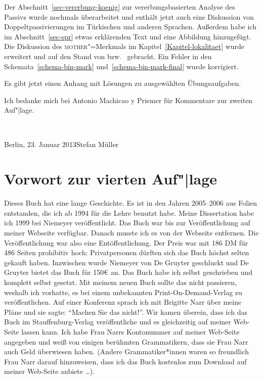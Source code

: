 Der Abschnitt~\ref{sec-vererbung-koenig} zur vererbungsbasierten Analyse des Passivs wurde nochmals
überarbeitet und enthält jetzt auch eine Diskussion von Doppeltpassivierungen im Türkischen und
anderen Sprachen. Außerdem habe ich im Abschnitt~\ref{sec-spr} etwas erklärenden Text und eine
Abbildung hinzugefügt. Die Diskussion des \textsc{mother}"=Merkmals im Kapitel~\ref{Kapitel-lokalitaet} wurde erweitert und auf
den Stand von  bzw.\  gebracht. 
Ein Fehler in den Schemata~\ref{schema-bin-mark} und~\ref{schema-bin-mark-final} wurde korrigiert.

Es gibt jetzt einen Anhang mit Lösungen zu ausgewählten Übungsaufgaben.

Ich bedanke mich bei Antonio Machicao y Priemer für Kommentare zur zweiten Auf"|lage.

~\medskip

\noindent
Berlin, 23. Januar 2013\hfill Stefan Müller


\section*{Vorwort zur vierten Auf"|lage}

Dieses Buch hat eine lange Geschichte. Es ist in den Jahren 2005–2006 aus Folien entstanden, die ich
ab 1994 für die Lehre benutzt habe. Meine Dissertation habe ich 1999 bei Niemeyer
veröffentlicht. Das Buch war bis zur Veröffentlichung auf meiner Webseite verfügbar. Danach musste
ich es von der Webseite entfernen. Die Veröffentlichung war also eine Entöffentlichung. Der Preis
war mit 186 DM für 486 Seiten prohibitiv hoch: Privatpersonen dürften sich das Buch höchst selten
gekauft haben. Inzwischen wurde Niemeyer von De Gruyter geschluckt und De Gruyter bietet das Buch für 150€
an. Das Buch habe ich selbst geschrieben und komplett selbst gesetzt. Mit meinem neuen Buch sollte das nicht passieren,
weshalb ich vorhatte, es bei einem unbekannten Print-On-Demand-Verlag zu veröffentlichen. Auf einer
Konferenz sprach ich mit Brigitte Narr über meine Pläne und sie sagte: "`Machen Sie das
nicht!"'. Wir kamen überein, dass ich das Buch im Stauffenburg-Verlag veröffentliche und es
gleichzeitig auf meiner Web-Seite lassen kann. Ich habe Frau Narrs Kontonummer auf meiner Web-Seite
angegeben und weiß von einigen berühmten Grammatikern, dass sie Frau Narr auch Geld überwiesen
haben. (Andere Grammatiker*innen waren so freundlich Frau Narr darauf hinzuweisen, dass ich das Buch
kostenlos zum Download auf meiner Web-Seite anbiete \ldots). 

